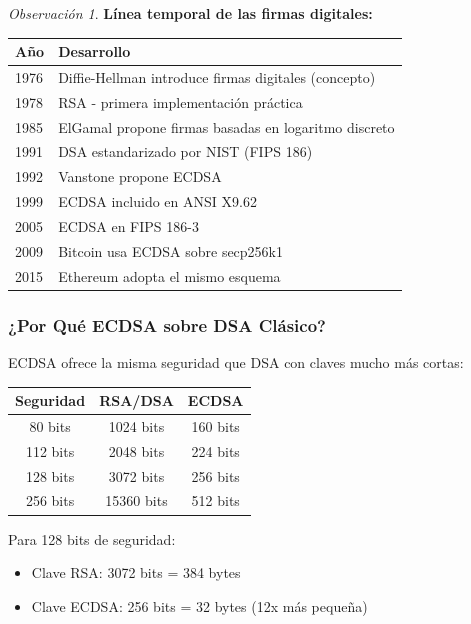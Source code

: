 \documentclass[11pt,a4paper,twoside,openright]{book}
\theoremstyle{definition}
\theoremstyle{plain}
\theoremstyle{remark}
\newtheorem{remark}{Observación}[chapter]
\begin{document}
\begin{remark}
\textbf{Línea temporal de las firmas digitales:}
\begin{center}
\begin{tabular}{ll}
\toprule
\textbf{Año} & \textbf{Desarrollo} \\
\midrule
1976 & Diffie-Hellman introduce firmas digitales (concepto) \\
1978 & RSA - primera implementación práctica \\
1985 & ElGamal propone firmas basadas en logaritmo discreto \\
1991 & DSA estandarizado por NIST (FIPS 186) \\
1992 & Vanstone propone ECDSA \\
1999 & ECDSA incluido en ANSI X9.62 \\
2005 & ECDSA en FIPS 186-3 \\
2009 & Bitcoin usa ECDSA sobre secp256k1 \\
2015 & Ethereum adopta el mismo esquema \\
\bottomrule
\end{tabular}
\end{center}
\end{remark}

\subsubsection{¿Por Qué ECDSA sobre DSA Clásico?}

\begin{keyidea}
ECDSA ofrece la misma seguridad que DSA con claves mucho más cortas:

\begin{center}
\begin{tabular}{ccc}
\toprule
\textbf{Seguridad} & \textbf{RSA/DSA} & \textbf{ECDSA} \\
\midrule
80 bits & 1024 bits & 160 bits \\
112 bits & 2048 bits & 224 bits \\
128 bits & 3072 bits & 256 bits \\
256 bits & 15360 bits & 512 bits \\
\bottomrule
\end{tabular}
\end{center}

Para 128 bits de seguridad:
\begin{itemize}
    \item Clave RSA: 3072 bits = 384 bytes
    \item Clave ECDSA: 256 bits = 32 bytes (12x más pequeña)
\end{itemize}
\end{keyidea}
\end{document}
